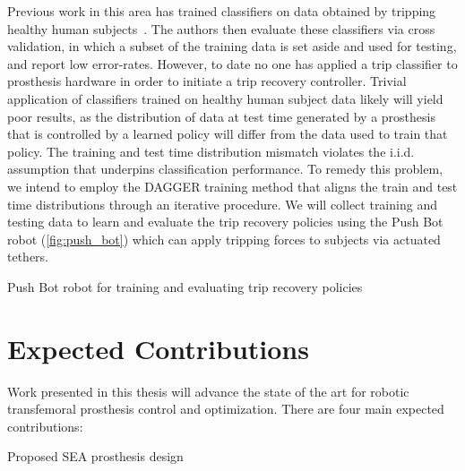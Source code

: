 Previous work in this area has trained classifiers on data obtained by tripping
healthy human subjects~\citep{lawson2010stumble, shirota2014recovery}. The
authors then evaluate these classifiers via cross validation, in which a subset
of the training data is set aside and used for testing, and report low
error-rates.  However, to date no one has applied a trip classifier to
prosthesis hardware in order to initiate a trip recovery controller. Trivial
application of classifiers trained on healthy human subject data likely will
yield poor results, as the distribution of data at test time generated by a
prosthesis that is controlled by a learned policy will differ from the data used
to train that policy. The training and test time distribution mismatch violates
the i.i.d. assumption that
underpins classification performance. To remedy this problem, we intend to
employ the DAGGER training method \citep{ross2011reduction} that aligns the
train and test time distributions through an iterative procedure. We will
collect training and testing data to learn and evaluate the trip recovery
policies using the Push Bot robot (\cref{fig:push_bot}) which can apply tripping
forces to subjects via actuated tethers.
\begin{marginfigure}[-3.5in]
    \centering
    \caption{Push Bot robot for training and evaluating trip recovery policies}
    \label{fig:push_bot}
\end{marginfigure}

\section{Expected Contributions}\label{sec:intro_contributions}

Work presented in this thesis will advance the state of the art for robotic
transfemoral prosthesis control and optimization. There are four main expected 
contributions: 

\begin{marginfigure}
    \centering
    \caption{Proposed SEA prosthesis design}
    \label{fig:prosthesis_design}
\end{marginfigure}

